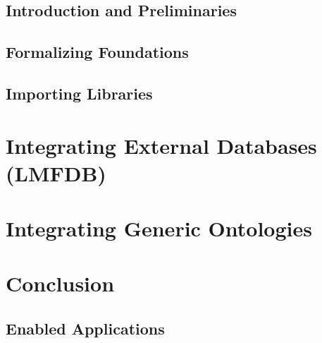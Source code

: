 \documentclass[a4paper,11pt]{book}
\begin{document}
\section{Introduction and Preliminaries}\label{sec:intro:prelim:pvs}


\section{Formalizing Foundations}\label{sec:import:pvs:found}


\section{Importing Libraries}\label{sec:import:pvs:import}



\chapter{Integrating External Databases (LMFDB)}\label{sec:import:lmfdb}




\chapter{Integrating Generic Ontologies}\label{sec:import:cas}



\chapter{Conclusion}\label{sec:import:conc}

\section{Enabled Applications}\label{sec:import:pvs:appl}



\end{document}
